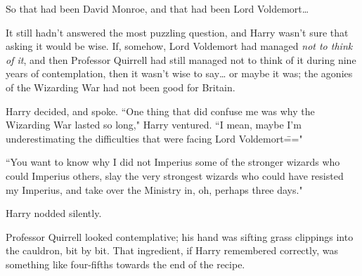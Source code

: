 So that had been David Monroe, and that had been Lord Voldemort{\ldots}

It still hadn't answered the most puzzling question, and Harry wasn't sure that asking it would be wise. If, somehow, Lord Voldemort had managed \emph{not to think of it}, and then Professor Quirrell had still managed not to think of it during nine years of contemplation, then it wasn't wise to say{\ldots} or maybe it was; the agonies of the Wizarding War had not been good for Britain.

Harry decided, and spoke. ``One thing that did confuse me was why the Wizarding War lasted so long," Harry ventured. ``I mean, maybe I'm underestimating the difficulties that were facing Lord Voldemort\==="

``You want to know why I did not Imperius some of the stronger wizards who could Imperius others, slay the very strongest wizards who could have resisted my Imperius, and take over the Ministry in, oh, perhaps three days."

Harry nodded silently.

Professor Quirrell looked contemplative; his hand was sifting grass clippings into the cauldron, bit by bit. That ingredient, if Harry remembered correctly, was something like four-fifths towards the end of the recipe.

